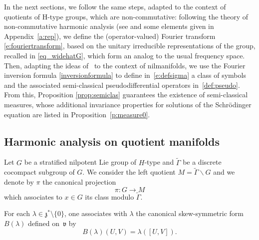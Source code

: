 \documentclass[10pt]{amsart}
\theoremstyle{plain}
\theoremstyle{definition}
\begin{document}
In the next sections, we follow the same steps, adapted to the context of quotients of H-type groups, which are non-commutative: following the theory of non-commutative harmonic analysis (see \cite{CG,Tay} and some elements given in Appendix~\ref{a:rep}), we define the (operator-valued) Fourier transform \eqref{e:fouriertransform}, based on the unitary irreducible representations of the group, recalled in \eqref{eq_widehatG}, which form an analog to the usual frequency space. Then, adapting the ideas of~\cite{FF1} to the context of nilmanifolds, we use the Fourier inversion formula \eqref{inversionformula} to define in~\eqref{e:defsigma} a class of symbols and the associated semi-classical pseudodifferential operators in~\eqref{def:pseudo}. From this, Proposition \ref{prop:semiclas} guarantees the existence of semi-classical measures, whose additional invariance properties for solutions of the Schrödinger equation are listed in Proposition~\ref{p:measure0}.

\subsection{Harmonic analysis on quotient manifolds}

Let $G$ be a stratified nilpotent Lie group of $H$-type and $\widetilde{\Gamma}$ be a discrete cocompact subgroup of $G$. We consider the left quotient $M=\widetilde{\Gamma}\backslash G$ and we denote by
$\pi$ the canonical projection
\[
\pi:G\to M
\]
which associates to $x\in G$ its class modulo $\widetilde{\Gamma}$.

For each $\lambda \in \mathfrak z^*\setminus\{0\}$, one associates with $\lambda$ the canonical skew-symmetric form $B(\lambda)$ defined on~$\mathfrak v$ by
\[
B(\lambda)(U,V)= \lambda([U,V]).
\]
\end{document}
